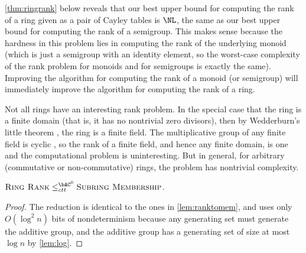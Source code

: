 \documentclass{article}
\begin{document}
%
\autoref{thm:ringrank} below reveals that our best upper bound for computing the rank of a ring given as a pair of Cayley tables is $\NL$, the same as our best upper bound for computing the rank of a semigroup.
This makes sense because the hardness in this problem lies in computing the rank of the underlying monoid (which is just a semigroup with an identity element, so the worst-case complexity of the rank problem for monoids and for semigroups is exactly the same).
Improving the algorithm for computing the rank of a monoid (or semigroup) will immediately improve the algorithm for computing the rank of a ring.

Not all rings have an interesting rank problem.
In the special case that the ring is a finite domain (that is, it has no nontrivial zero divisors), then by Wedderburn's little theorem \autocite[Theorem~3~§~11.1]{nicholson12}, the ring is a finite field.
The multiplicative group of any finite field is cyclic \autocite[Theorem~7~§~6.4]{nicholson12}, so the rank of a finite field, and hence any finite domain, is one and the computational problem is uninteresting.
But in general, for arbitrary (commutative or non-commutative) rings, the problem has nontrivial complexity.

\begin{lemma}\label{lem:ringranktomem}
  $\textsc{Ring Rank} \leq_{ctt}^{\bAC^0} \textsc{Subring Membership}$.
\end{lemma}
\begin{proof}
  The reduction is identical to the ones in \autoref{lem:ranktomem}, and uses only $O(\log^2 n)$ bits of nondeterminism because any generating set must generate the additive group, and the additive group has a generating set of size at most $\log n$ by \autoref{lem:log}.
\end{proof}
\end{document}
